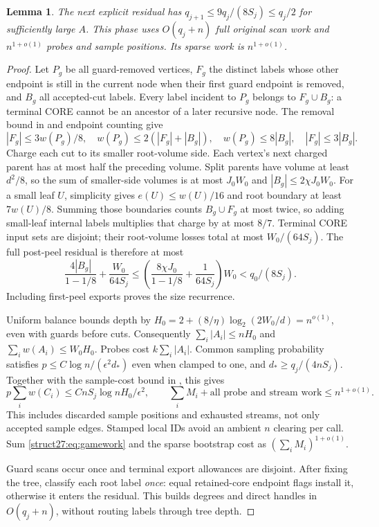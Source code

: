 \documentclass[11pt]{article}
\newtheorem{lemma}[theorem]{Lemma}
\theoremstyle{remark}
\begin{document}
\begin{lemma}\label{struct27:lem:covercharge}
The next explicit residual has $q_{j+1}\le9q_j/(8S_j)\le q_j/2$ for sufficiently
large $A$.
This phase uses $O(q_j+n)$ full original scan work and $n^{1+o(1)}$ probes and
sample positions.
Its sparse work is $n^{1+o(1)}$.
\end{lemma} \begin{proof} Let $P_g$ be all guard-removed vertices, $F_g$ the
distinct labels whose other endpoint is still in the current node when their
first guard endpoint is removed, and $B_g$ all accepted-cut labels.
Every label incident to $P_g$ belongs to $F_g\cup B_g$: a terminal CORE cannot
be an ancestor of a later recursive node.
The removal bound in  and endpoint counting give
\[
 |F_g|\le3w(P_g)/8,\quad w(P_g)\le2(|F_g|+|B_g|),\quad
 w(P_g)\le8|B_g|,\quad |F_g|\le3|B_g|.
\]
Charge each cut to its smaller root-volume side.
Each vertex's next charged parent has at most half the preceding volume.
Split parents have volume at least $d^2/8$, so the sum of smaller-side volumes
is at most $J_0W_0$ and $|B_g|\le2\chi J_0W_0$.
For a small leaf $U$, simplicity gives $e(U)\le w(U)/16$ and root boundary at
least $7w(U)/8$.
Summing those boundaries counts $B_g\cup F_g$ at most twice, so adding
small-leaf internal labels multiplies that charge by at most $8/7$.
Terminal CORE input sets are disjoint; their root-volume losses total at most
$W_0/(64S_j)$.
The full post-peel residual is therefore at most
\[
 \frac{4|B_g|}{1-1/8}+\frac{W_0}{64S_j}
 \le\left(\frac{8\chi J_0}{1-1/8}+\frac1{64S_j}\right)W_0
 <q_0/(8S_j).
\]
Including first-peel exports proves the size recurrence.

Uniform balance bounds depth by $H_0=2+ (8/\eta)\log_2(2W_0/d) =n^{o(1)}$, even with guards before cuts.
Consequently $\sum_i|A_i|\le nH_0$ and $\sum_iw(A_i)\le W_0H_0$.
Probes cost $k\sum_i|A_i|$.
Common sampling probability satisfies $p\le C \log n/(\epsilon^2d_*)$ even when
clamped to one, and $d_*\ge q_j/(4nS_j)$.
Together with the sample-cost bound in , this gives
\[
 p\sum_iw(C_i)\le CnS_j\log nH_0/\epsilon^2,
 \qquad\sum_i M_i+\text{all probe and stream work}\le n^{1+o(1)}.
\]
This includes discarded sample positions and exhausted streams, not only
accepted sample edges.
Stamped local IDs avoid an ambient $n$ clearing per call.
Sum \eqref{struct27:eq:gamework} and the sparse bootstrap cost as
$(\sum_iM_i)^{1+o(1)}$.

Guard scans occur once and terminal export allowances are disjoint.
After fixing the tree, classify each root label \emph{once}: equal retained-core
endpoint flags install it, otherwise it enters the residual.
This builds degrees and direct handles in $O(q_j+n)$, without routing labels
through tree depth.
\end{proof}
\end{document}
